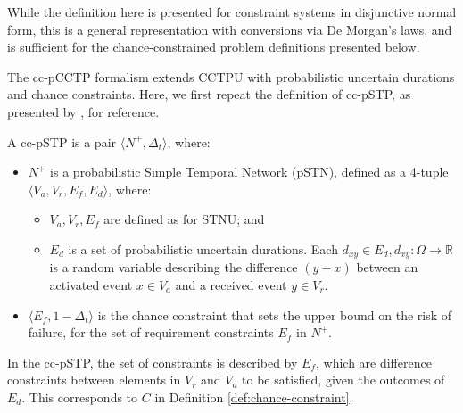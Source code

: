 \documentclass[jair,twoside,11pt,theapa]{article}
\begin{document}
While the definition here is presented for constraint systems in disjunctive normal form, this is a general representation with conversions via De Morgan's laws, and is sufficient for the chance-constrained problem definitions presented below.

The cc-pCCTP formalism extends CCTPU with probabilistic uncertain durations and chance
constraints. Here, we first repeat the definition of cc-pSTP, as presented by
, for reference.


\begin{mydef}
	
	A cc-pSTP is a pair $\langle N^+,\Delta_t\rangle$, where:
	
	\begin{itemize}
		
		\item $N^+$ is a probabilistic Simple Temporal Network (pSTN), defined as a
		4-tuple $\langle V_a,V_r,E_f,E_d\rangle$, where:
		
		\begin{itemize}
			
			\item $V_a,V_r,E_f$ are defined as for STNU; and 
			
			\item $E_d$ is a set of probabilistic uncertain durations. Each $d_{xy}\in
			E_d, d_{xy}:\Omega\rightarrow\mathbb{R}$ is a random variable describing the difference $(y-x)$ between an activated 
			event $x\in V_a$ and a received event $y\in V_r$. 
			
		\end{itemize}
		
		\item $\langle E_f, 1 - \Delta_t\rangle$ is the chance constraint that sets the upper bound
		on the risk of failure, for the set of requirement constraints $E_f$ in $N^+$.
		
	\end{itemize}
	
	
\end{mydef}

In the cc-pSTP, the set of constraints is described by $E_f$, which are
difference constraints between elements in $V_r$ and $V_a$ to be satisfied,
given the outcomes of $E_d$. This corresponds to $C$ in Definition
\ref{def:chance-constraint}.
\end{document}

